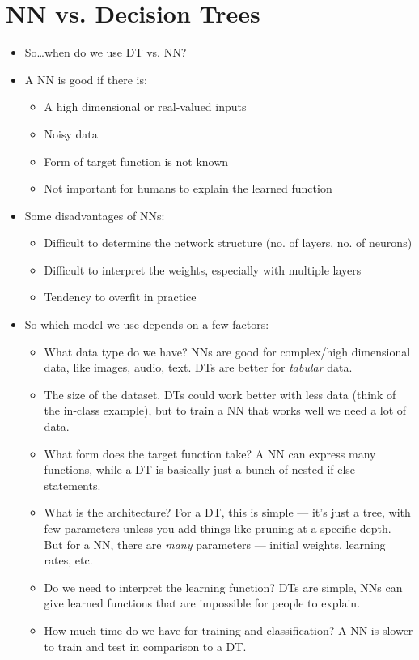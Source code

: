 \documentclass{article}
\begin{document}
\section{NN vs. Decision Trees}
\begin{itemize}
    \item So\dots when do we use DT vs. NN?
    \item A NN is good if there is:
        \begin{itemize}
            \item A high dimensional or real-valued inputs
            \item Noisy data
            \item Form of target function is not known
            \item Not important for humans to explain the learned function
        \end{itemize}
    \item Some disadvantages of NNs:
        \begin{itemize}
            \item Difficult to determine the network structure (no. of layers, no. of neurons)
            \item Difficult to interpret the weights, especially with multiple layers
            \item Tendency to overfit in practice
        \end{itemize}
    \item So which model we use depends on a few factors:
        \begin{itemize}
            \item What data type do we have?  NNs are good for complex/high dimensional data, like images, audio, text.  DTs are better for \emph{tabular} data.
            \item The size of the dataset.  DTs could work better with less data (think of the in-class example), but to train a NN that works well we need a lot of data.
            \item What form does the target function take?  A NN can express many functions, while a DT is basically just a bunch of nested if-else statements.
            \item What is the architecture?  For a DT, this is simple --- it's just a tree, with few parameters unless you add things like pruning at a specific depth.  But for a NN, there are \emph{many} parameters --- initial weights, learning rates, etc.
            \item Do we need to interpret the learning function?  DTs are simple, NNs can give learned functions that are impossible for people to explain.
            \item How much time do we have for training and classification?  A NN is slower to train and test in comparison to a DT.
        \end{itemize}
\end{itemize}
\end{document}
